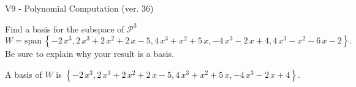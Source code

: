 \begin{exercise}
  \begin{exerciseTitle}V9 - Polynomial Computation (ver. 36)\end{exerciseTitle}
  \begin{exerciseStatement}
    Find a basis for the subspace of \(\mathcal{P}^3\) 
\[W=\mathrm{span}\ \left\{-2 \, x^{3} , 2 \, x^{3} + 2 \, x^{2} + 2 \, x - 5 , 4 \, x^{3} + x^{2} + 5 \, x , -4 \, x^{3} - 2 \, x + 4 , 4 \, x^{3} - x^{2} - 6 \, x - 2\right\}.\]
 Be sure to explain why your result is a basis.


  \end{exerciseStatement}
  \begin{exerciseAnswer}
   A basis of \(W\) is  \(\left\{-2 \, x^{3} , 2 \, x^{3} + 2 \, x^{2} + 2 \, x - 5 , 4 \, x^{3} + x^{2} + 5 \, x , -4 \, x^{3} - 2 \, x + 4\right\}\).
  


  \end{exerciseAnswer}
\end{exercise}